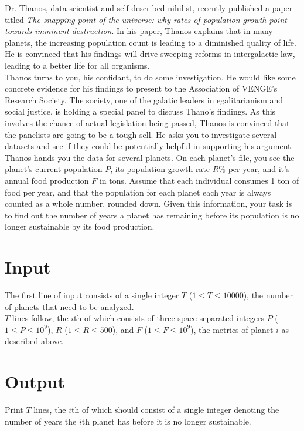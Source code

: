
\noindent Dr. Thanos, data scientist and self-described nihilist, recently published a paper titled \textit{The snapping point of the universe: why rates of population growth point towards imminent destruction}. In his paper, Thanos explains that in many planets, the increasing population count is leading to a diminished quality of life. He is convinced that his findings will drive sweeping reforms in intergalactic law, leading to a better life for all organisms.\\

Thanos turns to you, his confidant, to do some investigation. He would like some concrete evidence for his findings to present to the Association of VENGE's Research Society. The society, one of the galatic leaders in egalitarianism and social justice, is holding a special panel to discuss Thano's findings. As this involves the chance of actual legislation being passed, Thanos is convinced that the panelists are going to be a tough sell. He asks you to investigate several datasets and see if they could be potentially helpful in supporting his argument.\\

Thanos hands you the data for several planets. On each planet's file, you see the planet's current population $P$, its population growth rate $R\%$ per year, and it's annual food production $F$ in tons. Assume that each individual consumes 1 ton of food per year, and that the population for each planet each year is always counted as a whole number, rounded down. Given this information, your task is to find out the number of years a planet has remaining before its population is no longer sustainable by its food production.

\section*{Input}
The first line of input consists of a single integer $T$ ($1 \leq T \leq 10000$), the number of planets that need to be analyzed.\\
$T$ lines follow, the $i$th of which consists of three space-separated integers $P$ ($1 \leq P \leq 10^9$), $R$ ($1 \le R \le 500$), and $F$ ($1 \leq F \leq 10^9$), the metrics of planet $i$ as described above.

\section*{Output}
Print $T$ lines, the $i$th of which should consist of a single integer denoting the number of years the $i$th planet has before it is no longer sustainable.\\

